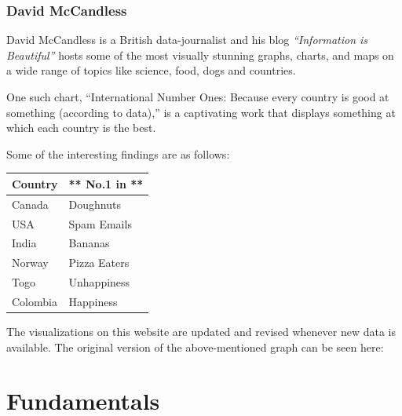\documentclass[]{book}
\theoremstyle{definition}
\theoremstyle{definition}
\theoremstyle{definition}
\theoremstyle{remark}
\begin{document}
\subsection{David McCandless}\label{david-mccandless}

David McCandless is a British data-journalist and his blog
\emph{``Information is Beautiful''} \citep{info_beautiful} hosts some of
the most visually stunning graphs, charts, and maps on a wide range of
topics like science, food, dogs and countries.

One such chart, ``International Number Ones: Because every country is
good at something (according to data),'' is a captivating work that
displays something at which each country is the best.
\citep{country_chart}

Some of the interesting findings are as follows:

\begin{longtable}[]{@{}ll@{}}
\toprule
\textbf{Country } & ** No.1 in **\tabularnewline
\midrule
\endhead
Canada & Doughnuts\tabularnewline
USA & Spam Emails\tabularnewline
India & Bananas\tabularnewline
Norway & Pizza Eaters\tabularnewline
Togo & Unhappiness\tabularnewline
Colombia & Happiness\tabularnewline
\bottomrule
\end{longtable}

The visualizations on this website are updated and revised whenever new
data is available. The original version of the above-mentioned graph can
be seen here: \citep{country_original}

\chapter{Fundamentals}\label{fundamentals}
\end{document}
